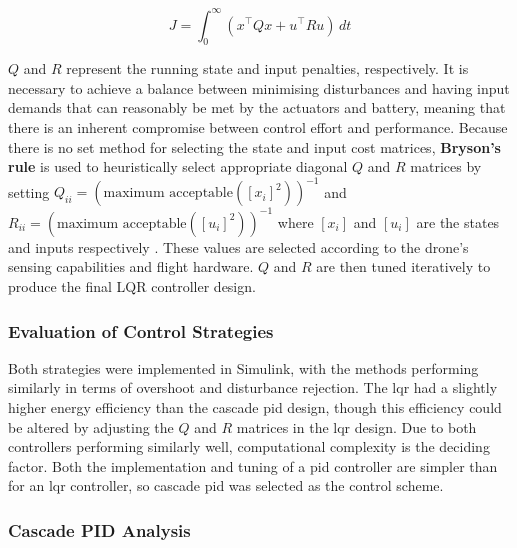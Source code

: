 \begin{equation} \label{eq:cost_function}
J = \int_0^\infty \left( x^\top Q x + u^\top R u \right) \, dt 
\end{equation}

$Q$ and $R$ represent the running state and input penalties, respectively. It is necessary to achieve a balance between minimising disturbances and having input demands that can reasonably be met by the actuators and battery, meaning that there is an inherent compromise between control effort and performance. Because there is no set method for selecting the state and input cost matrices, \textbf{Bryson's rule} is used to heuristically select appropriate diagonal $Q$ and $R$ matrices by setting $Q_{ii} = ({\text{maximum acceptable}( [x_i]^2 )})^{-1}$ and $R_{ii} = ({\text{maximum acceptable}( [u_i]^2 )})^{-1}$ where $[x_i]$ and $[u_i]$ are the states and inputs respectively \cite{chibum2014adv09designofsfb1}. These values are selected according to the drone's sensing capabilities and flight hardware. $Q$ and $R$ are then tuned iteratively to produce the final LQR controller design.

\subsubsection{Evaluation of Control Strategies}

Both strategies were implemented in Simulink, with the methods performing similarly in terms of overshoot and disturbance rejection. The \gls{lqr} had a slightly higher energy efficiency than the cascade \gls{pid} design, though this efficiency could be altered by adjusting the $Q$ and $R$ matrices in the \gls{lqr} design. Due to both controllers performing similarly well, computational complexity is the deciding factor. Both the implementation and tuning of a \gls{pid} controller are simpler than for an \gls{lqr} controller, so cascade \gls{pid} was selected as the control scheme.

\subsubsection{Cascade PID Analysis}
\label{sec:cascpid}

